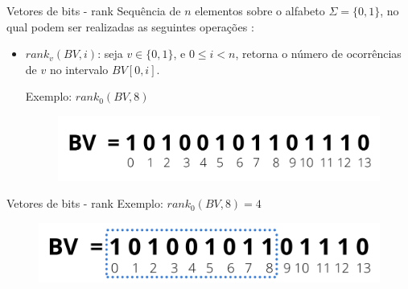     
    \begin{frame}{Vetores de bits - rank}
    Sequência de $n$ elementos sobre o alfabeto $\Sigma = \{0,1\}$, no qual podem ser realizadas as seguintes operações \citep{book-compact-data-structures}:
        \vspace{0.5cm}
        \begin{itemize} 
            \item $rank_v(BV,i)$: seja $v \in \{0,1\}$, e $0 \leq i < n$, retorna o número de ocorrências de $v$ no intervalo $BV[0,i]$.
            \vspace{0.5cm}
            
            Exemplo: $rank_0(BV,8)$
            
            \begin{figure}[h!]
                \centering
                \includegraphics[scale=0.5]{images/bitvector.png}
            \end{figure} 
        \end{itemize}
    \end{frame}
    
    \begin{frame}{Vetores de bits - rank}
        Exemplo: $rank_0(BV,8)=4$
        \begin{figure}[h!]
            \centering
            \includegraphics[scale=0.7]{images/rank-res.png}
        \end{figure} 
    \end{frame}
    
